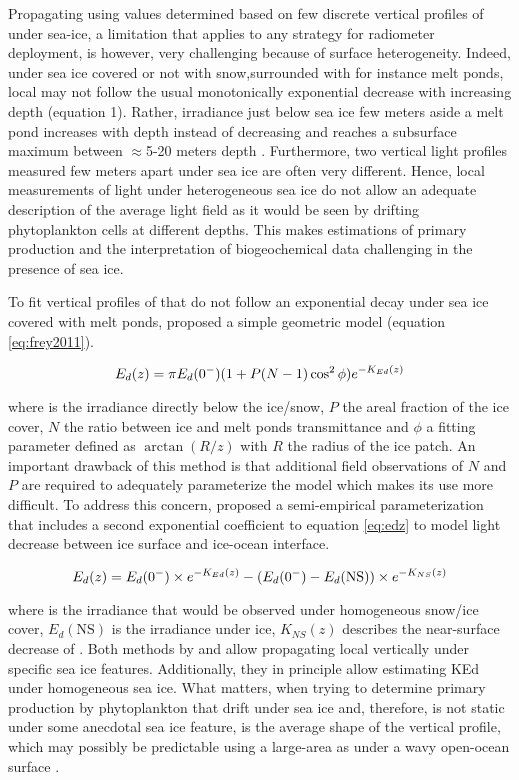 Propagating \edz{} using \ked{} values determined based on few discrete vertical profiles of \edz{} under sea-ice, a limitation that applies to any strategy for radiometer deployment, is however, very challenging because of surface heterogeneity. Indeed, under sea ice covered or not with snow,surrounded with for instance melt ponds, local \ed{} may not follow the usual monotonically exponential decrease with increasing depth (equation 1). Rather, irradiance just below sea ice few meters aside a melt pond increases with depth instead of decreasing and reaches a subsurface maximum between $\approx$5-20 meters depth \citep{Frey2011, Katlein2016, Laney2017}. Furthermore, two vertical light profiles measured few meters apart under sea ice are often very different. Hence, local measurements of light under heterogeneous sea ice do not allow an adequate description of the average light field as it would be seen by drifting phytoplankton cells at different depths. This makes estimations of primary production and the interpretation of biogeochemical data challenging in the presence of sea ice.

To fit vertical profiles of \edz{} that do not follow an exponential decay under sea ice covered with melt ponds,  \citet{Frey2011} proposed a simple geometric model (equation \ref{eq:frey2011}). 

\begin{equation}
    {E_d(z)}{} = \pi {E_d(0^-)}{} (1 + P(N-1)\cos^2\phi)e^{-K_{Ed}(z)}
    \label{eq:frey2011}
\end{equation}

where \edzero{} is the irradiance directly below the ice/snow, $P$ the areal fraction of the ice cover, $N$ the ratio between ice and melt ponds transmittance and $\phi$ a fitting parameter defined as $\arctan(R/z)$ with $R$ the radius of the ice patch. An important drawback of this method is that additional field observations of $N$ and $P$ are required to adequately parameterize the model which makes its use more difficult. To address this concern, \citet{Laney2017} proposed a semi-empirical parameterization that includes a second exponential coefficient to equation \ref{eq:edz} to model light decrease between ice surface and ice-ocean interface.

\begin{equation}
    {E_d(z)}{} = {E_d(0^-)}{} \times e^{-K_{Ed}(z)} - ({E_d(0^-)}{} - E_d(\text{NS})) \times e^{-K_{NS}(z)}
    \label{eq:laney2017}
\end{equation}

where \edzero{} is the irradiance that would be observed under homogeneous snow/ice cover, $E_d(\text{NS})$ is the irradiance under ice, $K_{NS}(z)$ describes the near-surface decrease of \edzero{}.  Both methods by \citet{Frey2011} and \citet{Laney2017} allow propagating local \edz{} vertically under specific sea ice features. Additionally, they in principle allow estimating KEd under homogeneous sea ice. What matters, when trying to determine primary production by phytoplankton that drift under sea ice and, therefore, is not static under some anecdotal sea ice feature, is the average shape of the vertical \edz{} profile, which may possibly be predictable using a large-area \meanked{} as under a wavy open-ocean surface \citep{Zaneveld2001}. 

